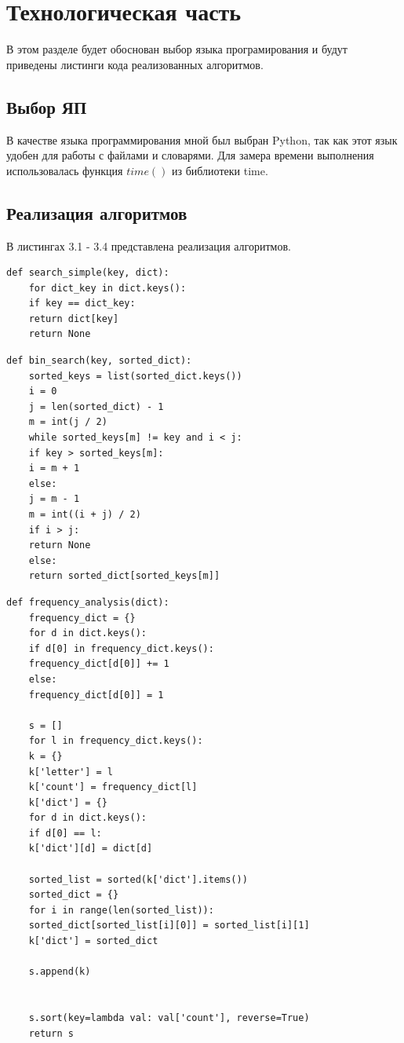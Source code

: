 \documentclass[12pt]{report}
\begin{document}
\chapter{Технологическая часть}
В этом разделе будет обоснован выбор языка програмирования и будут приведены листинги кода реализованных алгоритмов.

\section{Выбор ЯП}
В качестве языка программирования мной был выбран Python, так как этот язык удобен для работы с файлами и словарями.
Для замера времени выполнения использовалась функция $time()$ из библиотеки time.

\section{Реализация алгоритмов}

В листингах 3.1 - 3.4 представлена реализация алгоритмов.

\begin{lstlisting}[label={lst:1},caption= Алгоритм полного перебора.]
	def search_simple(key, dict):
	for dict_key in dict.keys():
	if key == dict_key:
	return dict[key]
	return None
\end{lstlisting}

\begin{lstlisting}[label={lst:conv1},caption=Алгоритм бинарного поиска.]
	def bin_search(key, sorted_dict):
	sorted_keys = list(sorted_dict.keys())
	i = 0
	j = len(sorted_dict) - 1
	m = int(j / 2)
	while sorted_keys[m] != key and i < j:
	if key > sorted_keys[m]:
	i = m + 1
	else:
	j = m - 1
	m = int((i + j) / 2)
	if i > j:
	return None
	else:
	return sorted_dict[sorted_keys[m]]
\end{lstlisting}


\begin{lstlisting}[label={lst:conv1},caption=Частотный анализ.]
	def frequency_analysis(dict):
	frequency_dict = {}
	for d in dict.keys():
	if d[0] in frequency_dict.keys():
	frequency_dict[d[0]] += 1
	else:
	frequency_dict[d[0]] = 1
	
	s = []
	for l in frequency_dict.keys():
	k = {}
	k['letter'] = l
	k['count'] = frequency_dict[l]
	k['dict'] = {}
	for d in dict.keys():
	if d[0] == l:
	k['dict'][d] = dict[d]
	
	sorted_list = sorted(k['dict'].items())
	sorted_dict = {}
	for i in range(len(sorted_list)):
	sorted_dict[sorted_list[i][0]] = sorted_list[i][1]
	k['dict'] = sorted_dict
	
	s.append(k)
	
	
	s.sort(key=lambda val: val['count'], reverse=True)
	return s
\end{lstlisting}
\end{document}
